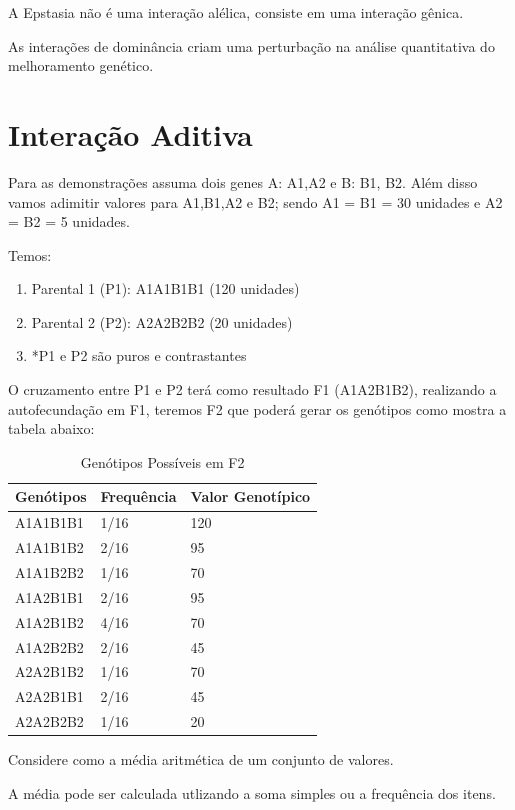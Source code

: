 A Epstasia não é uma interação alélica, consiste em uma interação gênica.

As interações de dominância criam uma perturbação na análise quantitativa do melhoramento genético.

\section{Interação Aditiva}

Para as demonstrações assuma dois genes A: A1,A2 e B: B1, B2. Além disso vamos adimitir valores para A1,B1,A2 e B2; sendo A1 = B1 = 30 unidades e A2 = B2 = 5 unidades.

Temos:

\begin{enumerate}
\item  Parental 1 (P1): A1A1B1B1 (120 unidades)
\item  Parental 2 (P2): A2A2B2B2 (20 unidades)
\item  *P1 e P2 são puros e contrastantes
\end{enumerate}

O cruzamento entre P1 e P2 terá como resultado F1 (A1A2B1B2), realizando a autofecundação em F1, teremos F2 que poderá gerar os genótipos como mostra a tabela abaixo:



\begin{table}[h]
\centering
\begin{tabular}{l l l}
\toprule
 \textbf{Genótipos} & \textbf{Frequência} & \textbf{Valor Genotípico}\\
\midrule
 A1A1B1B1 & 1/16 & 120 \\
 A1A1B1B2 & 2/16 & 95  \\
 A1A1B2B2 & 1/16 & 70  \\
 A1A2B1B1 & 2/16 & 95  \\
 A1A2B1B2 & 4/16 & 70  \\
 A1A2B2B2 & 2/16 & 45  \\
 A2A2B1B2 & 1/16 & 70  \\
 A2A2B1B1 & 2/16 & 45  \\
 A2A2B2B2 & 1/16 & 20  \\
\bottomrule
\end{tabular}
\caption{Genótipos Possíveis em F2} \label{tab:t01}
\end{table}

Considere  como a média aritmética de um conjunto de valores.

A média pode ser calculada utlizando a soma simples ou a frequência dos itens.

